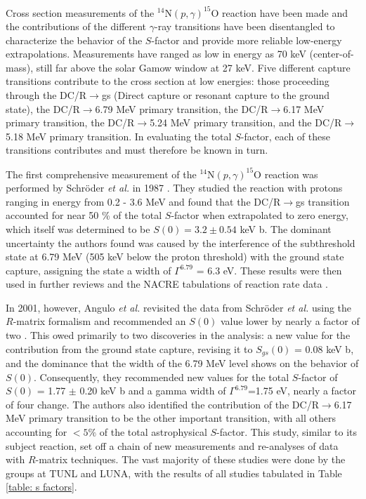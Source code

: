 Cross section measurements of the $^{14}$N$\left( p,\gamma \right) ^{15}$O reaction have been made and the contributions of the different $\gamma$-ray transitions have been disentangled to characterize the behavior of the $S$-factor  and provide more reliable low-energy extrapolations. Measurements have ranged as low in energy as 70 keV (center-of-mass), still far above the solar Gamow window at 27 keV. Five different capture transitions contribute to the cross section at low energies: those proceeding through the DC/R$\rightarrow$gs (Direct capture or resonant capture to the ground state), the DC/R$\rightarrow$6.79 MeV primary transition, the DC/R$\rightarrow$6.17 MeV primary transition, the DC/R$\rightarrow$5.24 MeV primary transition, and the DC/R$\rightarrow$5.18 MeV primary transition. In evaluating the total $S$-factor, each of these transitions contributes and must therefore be known in turn. 

The first comprehensive measurement of the $^{14}$N$\left( p,\gamma \right) ^{15}$O reaction was performed by Schr{\"o}der \textit{et al.} in 1987 \cite{Schroder1987}. They studied the reaction with protons ranging in energy from 0.2 - 3.6 MeV and found that the DC/R$\rightarrow$gs transition accounted for near 50 \% of the total $S$-factor when extrapolated to zero energy, which itself was determined to be $S(0) = 3.2 \pm 0.54$ keV b. The dominant uncertainty the authors found was caused by the interference of the subthreshold state at 6.79 MeV (505 keV below the proton threshold) with the ground state capture, assigning the state a width of $\Gamma^{6.79}$ = 6.3 eV. These results were then used in further reviews \cite{Adelberger1998} and the NACRE tabulations of reaction rate data \cite{Angulo1999}. 

In 2001, however, Angulo \textit{et al.} revisited the data from Schr{\"o}der \textit{et al.} \cite{Schroder1987} using the $R$-matrix formalism and recommended an $S(0)$ value lower by nearly a factor of two \cite{Angulo2001}. This owed primarily to two discoveries in the analysis: a new value for the contribution from the ground state capture, revising it to $S_{gs}(0)$ = 0.08 keV b, and the dominance that the width of the 6.79 MeV level shows on the behavior of $S(0)$. Consequently, they recommended new values for the total $S$-factor of $S(0)$ = 1.77 $\pm$ 0.20 keV b and a gamma width of $\Gamma^{6.79}$=1.75 eV, nearly a factor of four change. The authors also identified the contribution of the DC/R$\rightarrow$6.17 MeV primary transition to be the other important transition, with all others accounting for $< 5\%$ of the total astrophysical $S$-factor. This study, similar to its subject reaction, set off a chain of new measurements and re-analyses of data with $R$-matrix techniques. The vast majority of these studies were done by the groups at TUNL and LUNA, with the results of all studies tabulated in Table \ref{table: s factors}.

